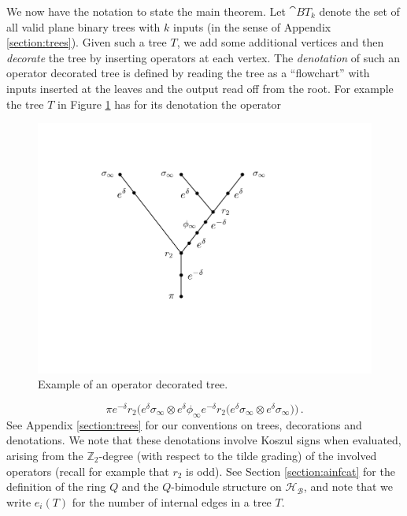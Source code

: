 \documentclass[english,letter paper,12pt,leqno]{article}
\theoremstyle{example}
\numberwithin{equation}{section}
\def\BB{\mathcal{B}}
\def\HH{\HH}
\def\HH{\mathcal{H}}
\def\be{\begin{equation}}
\def\ee{\end{equation}}
\def\nZ{\mathds{Z}}
\begin{document}
We now have the notation to state the main theorem. Let $\cat{BT}_k$ denote the set of all valid plane binary trees with $k$ inputs (in the sense of Appendix \ref{section:trees}). Given such a tree $T$, we add some additional vertices and then \emph{decorate} the tree by inserting operators at each vertex. The \emph{denotation} of such an operator decorated tree is defined by reading the tree as a ``flowchart'' with inputs inserted at the leaves and the output read off from the root. For example the tree $T$ in Figure \ref{fig:opdectree} has for its denotation the operator
\begin{figure}
\begin{center}
\includegraphics[scale=0.35]{dia13}
\end{center}
\centering
\caption{Example of an operator decorated tree.}\label{fig:opdectree}
\end{figure}
\be\label{eq:explicit_tree_operator}
\pi e^{-\delta} r_2\Big( e^{\delta}\sigma_\infty \otimes e^{\delta} \phi_\infty e^{-\delta} r_2\Big( e^{\delta} \sigma_\infty \otimes e^{\delta} \sigma_\infty \Big) \Big)\,.
\ee
See Appendix \ref{section:trees} for our conventions on trees, decorations and denotations. We note that these denotations involve Koszul signs when evaluated, arising from the $\nZ_2$-degree (with respect to the tilde grading) of the involved operators (recall for example that $r_2$ is odd). See Section \ref{section:ainfcat} for the definition of the ring $Q$ and the $Q$-bimodule structure on $\HH_{\BB}$, and note that we write $e_i(T)$ for the number of internal edges in a tree $T$.
\end{document}
